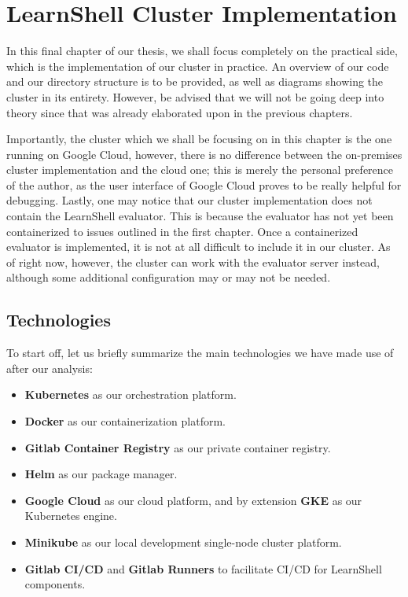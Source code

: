 \documentclass[thesis=B,english]{FITthesis}[2019/12/23]
\begin{document}
\chapter{LearnShell Cluster Implementation}

In this final chapter of our thesis, we shall focus completely on the practical side, which is the implementation of our cluster in practice. An overview of our code and our directory structure is to be provided, as well as diagrams showing the cluster in its entirety. However, be advised that we will not be going deep into theory since that was already elaborated upon in the previous chapters.

Importantly, the cluster which we shall be focusing on in this chapter is the one running on Google Cloud, however, there is no difference between the on-premises cluster implementation and the cloud one; this is merely the personal preference of the author, as the user interface of Google Cloud proves to be really helpful for debugging. Lastly, one may notice that our cluster implementation does not contain the LearnShell evaluator. This is because the evaluator has not yet been containerized to issues outlined in the first chapter. Once a containerized evaluator is implemented, it is not at all difficult to include it in our cluster. As of right now, however, the cluster can work with the evaluator server instead, although some additional configuration may or may not be needed.

\clearpage

\section{Technologies}

To start off, let us briefly summarize the main technologies we have made use of after our analysis:

\begin{itemize}
  \setlength\itemsep{0em}
  \item \textbf{Kubernetes} as our orchestration platform.
  \item \textbf{Docker} as our containerization platform.
  \item \textbf{Gitlab Container Registry} as our private container registry.
  \item \textbf{Helm} as our package manager.
  \item \textbf{Google Cloud} as our cloud platform, and by extension \textbf{GKE} as our Kubernetes engine.
  \item \textbf{Minikube} as our local development single-node cluster platform.
  \item \textbf{Gitlab CI/CD} and \textbf{Gitlab Runners} to facilitate CI/CD for LearnShell components.
\end{itemize}
\end{document}
